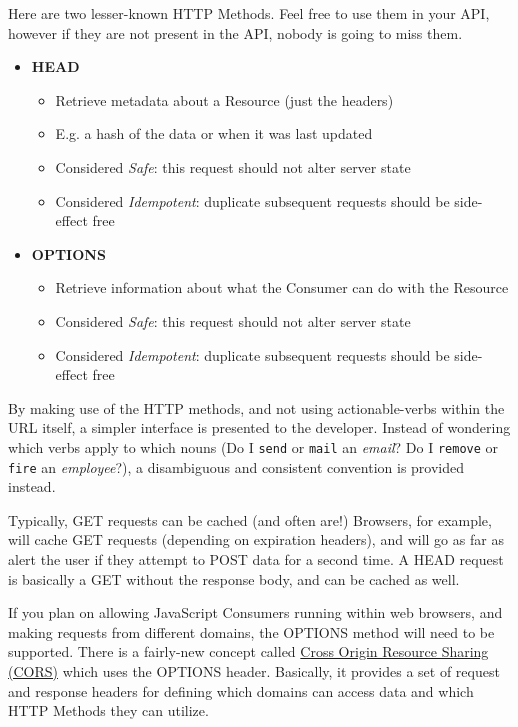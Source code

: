 \documentclass{book}
\begin{document}
Here are two lesser-known HTTP Methods. Feel free to use them in your API, however if they are not present in the API, nobody is going to miss them.

\begin{itemize}
\item \textbf{HEAD}
    \begin{itemize}
    \item Retrieve metadata about a Resource (just the headers)
    \item E.g. a hash of the data or when it was last updated
    \item Considered \emph{Safe}: this request should not alter server state
    \item Considered \emph{Idempotent}: duplicate subsequent requests should be side-effect free
    \end{itemize}
\item \textbf{OPTIONS}
    \begin{itemize}
    \item Retrieve information about what the Consumer can do with the Resource
    \item Considered \emph{Safe}: this request should not alter server state
    \item Considered \emph{Idempotent}: duplicate subsequent requests should be side-effect free
    \end{itemize}
\end{itemize}

By making use of the HTTP methods, and not using actionable-verbs within the URL itself, a simpler interface is presented to the developer. Instead of wondering which verbs apply to which nouns (Do I \texttt{send} or \texttt{mail} an \emph{email}? Do I \texttt{remove} or \texttt{fire} an \emph{employee}?), a disambiguous and consistent convention is provided instead.

Typically, GET requests can be cached (and often are!) Browsers, for example, will cache GET requests (depending on expiration headers), and will go as far as alert the user if they attempt to POST data for a second time. A HEAD request is basically a GET without the response body, and can be cached as well.

If you plan on allowing JavaScript Consumers running within web browsers, and making requests from different domains, the OPTIONS method will need to be supported. There is a fairly-new concept called \href{https://en.wikipedia.org/wiki/Cross-origin_resource_sharing}{Cross Origin Resource Sharing (CORS)} which uses the OPTIONS header. Basically, it provides a set of request and response headers for defining which domains can access data and which HTTP Methods they can utilize.
\end{document}
